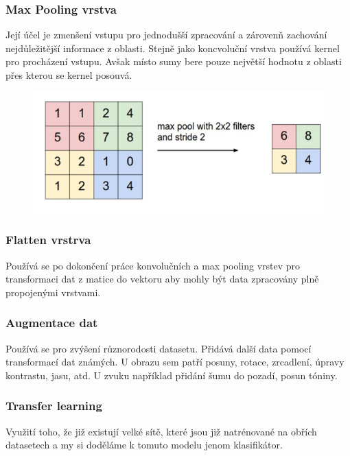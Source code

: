\subsubsection{Max Pooling vrstva}
Její účel je zmenšení vstupu pro jednodušší zpracování a zárovenň zachování nejdůležitější informace z oblasti. Stejně jako koncvoluční vrstva používá kernel
pro procházení vstupu. Avšak místo sumy bere pouze největší hodnotu z oblasti přes kterou se kernel posouvá.\\
\begin{figure}[ht]
    \includegraphics[scale=0.7]{images/MaxPooling.png}
\end{figure}

\subsubsection{Flatten vrstrva}
Používá se po dokončení práce konvolučních a max pooling vrstev pro transformaci dat z matice do vektoru aby mohly být data zpracovány plně propojenými vrstvami. 

\subsubsection{Augmentace dat}
Používá se pro zvýšení různorodosti datasetu. Přidává další data pomocí transformací dat známých.
U obrazu sem patří posuny, rotace, zrcadlení, úpravy kontrastu, jasu, atd. U zvuku například přidání šumu do pozadí, posun tóniny.

\subsubsection{Transfer learning}
Využití toho, že již existují velké sítě, které jsou již natrénované na obřích datasetech a my si doděláme k tomuto modelu jenom klasifikátor.

